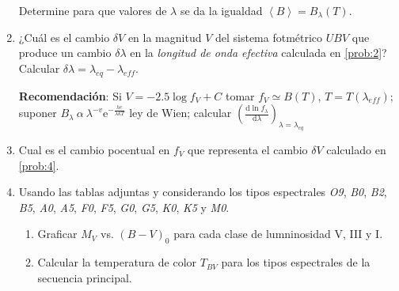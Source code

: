 \documentclass[10pt,spanish,a4paper,1p]{practice}
\begin{document}
\begin{enumerate}[wide, labelwidth=!, labelindent=0pt, label=\textbf{\textrm{\arabic*)}}, ref=\arabic*]
    Determine para que valores de $\lambda$ se da la igualdad $\left\langle B\right\rangle = B_{\lambda} \left(T\right)$.


    \item \label{prob:4} ¿Cuál es el cambio $\delta V$ en la magnitud $V$ del sistema fotmétrico $UBV$ que produce un cambio $\delta\lambda$ en la \emph{longitud de onda efectiva} calculada en \ref{prob:2}? Calcular $\delta\lambda = {\lambda}_{eq} - {\lambda}_{eff}$.

    \textbf{Recomendación}:
    Si $V = -2.5 \log f_V + C$ tomar $f_V \simeq B\left(T\right) $, $T=T\left({\lambda}_{eff}\right)$; suponer $B_{\lambda}\ \alpha\ {\lambda}^{-v} \mathrm{e}^{-\frac{hc}{\lambda k T}}$ ley de Wien; calcular $\left(\frac{\mathrm{d} \ln {f}_{\lambda}}{\mathrm{d}\lambda}\right)_{\lambda = {\lambda}_{eq}}$

    \item \label{prob:5} Cual es el cambio pocentual en $f_V$ que representa el cambio $\delta V$ calculado en \ref{prob:4}.

    \item \label{prob:6} Usando las tablas adjuntas y considerando los tipos espectrales \emph{O9},
    \emph{B0}, \emph{B2}, \emph{B5}, \emph{A0}, \emph{A5}, \emph{F0}, \emph{F5}, \emph{G0}, \emph{G5}, \emph{K0}, \emph{K5} y \emph{M0}.

      \begin{enumerate}
        \item Graficar $M_V$ vs. $\left(B-V\right)_{0}$ para cada clase de lumninosidad V, III y I.

        \item \label{prob:6:a} Calcular la temperatura de color $T_{BV}$ para los tipos espectrales de la secuencia principal.


\end{enumerate}
\end{enumerate}
\end{document}
